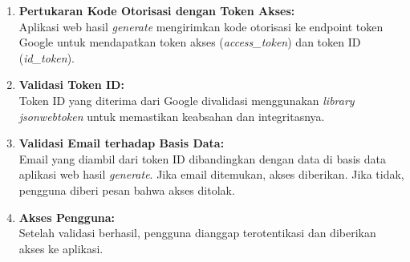 \begin{enumerate}[label*=\arabic*.,ref=\arabic*]
\begin{enumerate}[label=\alph*.]
        \item \textbf{Pertukaran Kode Otorisasi dengan Token Akses:}\\
        Aplikasi web hasil \textit{generate} mengirimkan kode otorisasi ke endpoint token Google untuk mendapatkan token akses (\textit{access\_token}) dan token ID (\textit{id\_token}).

        \item \textbf{Validasi Token ID:}\\
        Token ID yang diterima dari Google divalidasi menggunakan \textit{library} \textit{jsonwebtoken} untuk memastikan keabsahan dan integritasnya.

        \item \textbf{Validasi Email terhadap Basis Data:}\\
        Email yang diambil dari token ID dibandingkan dengan data di basis data aplikasi web hasil \textit{generate}. Jika email ditemukan, akses diberikan. Jika tidak, pengguna diberi pesan bahwa akses ditolak.

        \item \textbf{Akses Pengguna:}\\
        Setelah validasi berhasil, pengguna dianggap terotentikasi dan diberikan akses ke aplikasi.
    \end{enumerate}
\end{enumerate}
